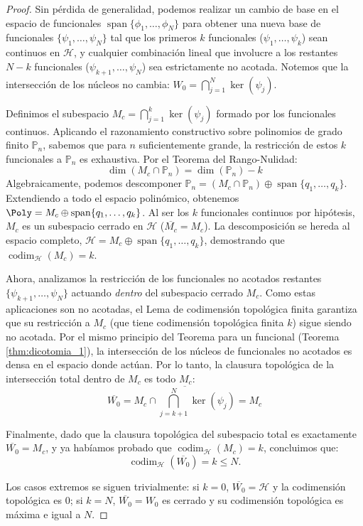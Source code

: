 \begin{proof}
	Sin pérdida de generalidad, podemos realizar un cambio de base en el espacio de funcionales $\operatorname{span}\{\phi_1, \dots, \phi_N\}$ para obtener una nueva base de funcionales $\{\psi_1, \dots, \psi_N\}$ tal que los primeros $k$ funcionales ($\psi_1, \dots, \psi_k$) sean continuos en $\mathcal{H}$, y cualquier combinación lineal que involucre a los restantes $N-k$ funcionales ($\psi_{k+1}, \dots, \psi_N$) sea estrictamente no acotada. Notemos que la intersección de los núcleos no cambia: $W_0 = \bigcap_{j=1}^N \ker(\psi_j)$.

	Definimos el subespacio $M_c = \bigcap_{j=1}^k \ker(\psi_j)$ formado por los funcionales continuos.
	Aplicando el razonamiento constructivo sobre polinomios de grado finito $\mathbb{P}_n$, sabemos que para $n$ suficientemente grande, la restricción de estos $k$ funcionales a $\mathbb{P}_n$ es exhaustiva. Por el Teorema del Rango-Nulidad:
	$$ \dim(M_c \cap \mathbb{P}_n) = \dim(\mathbb{P}_n) - k $$
	Algebraicamente, podemos descomponer $\mathbb{P}_n = (M_c \cap \mathbb{P}_n) \oplus \operatorname{span}\{q_1, \dots, q_k\}$. Extendiendo a todo el espacio polinómico, obtenemos $\Poly = M_c \oplus \operatorname{span}\{q_1, \dots, q_k\}$.
	Al ser los $k$ funcionales continuos por hipótesis, $M_c$ es un subespacio cerrado en $\mathcal{H}$ ($\overline{M_c} = M_c$). La descomposición se hereda al espacio completo, $\mathcal{H} = M_c \oplus \operatorname{span}\{q_1, \dots, q_k\}$, demostrando que $\operatorname{codim}_\mathcal{H}(M_c) = k$.

	Ahora, analizamos la restricción de los funcionales no acotados restantes $\{\psi_{k+1}, \dots, \psi_N\}$ actuando \textit{dentro} del subespacio cerrado $M_c$.
	Como estas aplicaciones son no acotadas, el Lema de codimensión topológica finita garantiza que su restricción a $M_c$ (que tiene codimensión topológica finita $k$) sigue siendo no acotada.
	Por el mismo principio del Teorema para un funcional (Teorema \ref{thm:dicotomia_1}), la intersección de los núcleos de funcionales no acotados es densa en el espacio donde actúan.
	Por lo tanto, la clausura topológica de la intersección total dentro de $M_c$ es todo $M_c$:
	$$ \overline{W_0} = \overline{M_c \cap \bigcap_{j=k+1}^N \ker(\psi_j)} = M_c $$

	Finalmente, dado que la clausura topológica del subespacio total es exactamente $\overline{W_0} = M_c$, y ya habíamos probado que $\operatorname{codim}_\mathcal{H}(M_c) = k$, concluimos que:
	$$ \operatorname{codim}_\mathcal{H}(\overline{W_0}) = k \le N. $$

	Los casos extremos se siguen trivialmente: si $k=0$, $\overline{W_0} = \mathcal{H}$ y la codimensión topológica es 0; si $k=N$, $\overline{W_0} = W_0$ es cerrado y su codimensión topológica es máxima e igual a $N$.
\end{proof}

